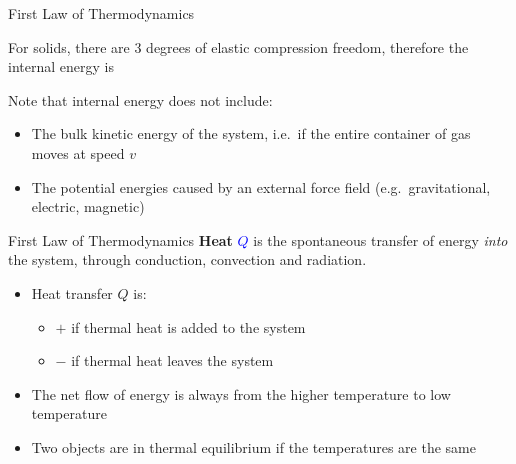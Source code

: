 \documentclass[12pt,aspectratio=169]{beamer}
\newcommand{\pic}[2]{
  \begin{center}
    \texttt{[image: \#2]}
  \end{center}
}
\newcommand{\eq}[2]{\vspace{#1}{\Large\begin{displaymath}#2\end{displaymath}}}
\begin{document}
\begin{frame}{First Law of Thermodynamics}
  \eq{-.2in}{
    \boxed{\Delta\textcolor{red}{U}=Q-W}
  }

  For solids, there are 3 degrees of elastic compression freedom, therefore the
  internal energy is

  \eq{-.3in}{
    U=3Nk_BT
  }

  Note that internal energy does not include:
  \begin{itemize}
  \item The bulk kinetic energy of the system, i.e.\ if the entire container
    of gas moves at speed $v$
  \item The potential energies caused by an external force field (e.g.\
    gravitational, electric, magnetic)
  \end{itemize}
\end{frame}



\begin{frame}{First Law of Thermodynamics}
  \textbf{Heat} \textcolor{blue}{$Q$} is the spontaneous transfer of energy
  \emph{into} the system, through conduction, convection and radiation.

  \eq{-.2in}{
    \boxed{\Delta U=\textcolor{blue}{Q}-W}
  }
  \begin{itemize}
  \item\vspace{-.2in} Heat transfer $Q$ is:
    \begin{itemize}
    \item $+$ if thermal heat is added to the system
    \item $-$ if thermal heat leaves the system
    \end{itemize}
  \item The net flow of energy is always from the higher temperature to low
    temperature
  \item Two objects are in thermal equilibrium if the temperatures are the same
  \end{itemize}
\end{frame}
%
%
%
\end{document}
